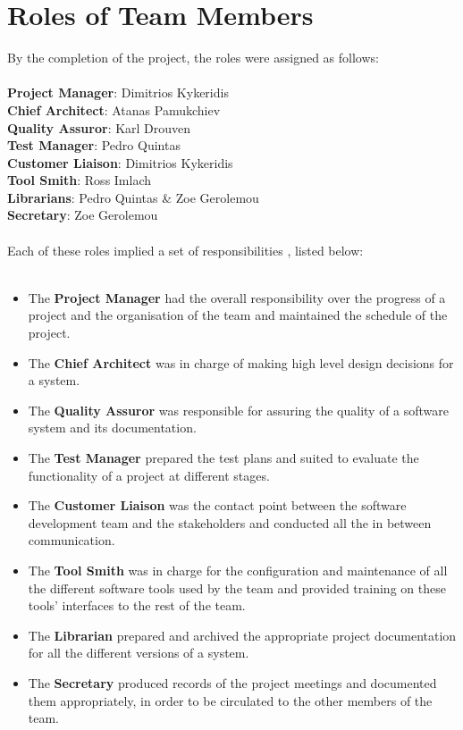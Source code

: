 \documentclass{l3proj}
\begin{document}
\section{Roles of Team Members}
\par
By the completion of the project, the roles were assigned as follows:\\
\\
\textbf{Project Manager}: Dimitrios Kykeridis\\
\textbf{Chief Architect}: Atanas Pamukchiev\\
\textbf{Quality Assuror}: Karl Drouven\\
\textbf{Test Manager}: Pedro Quintas\\
\textbf{Customer Liaison}: Dimitrios Kykeridis\\
\textbf{Tool Smith}: Ross Imlach\\
\textbf{Librarians}: Pedro Quintas \& Zoe Gerolemou\\
\textbf{Secretary}: Zoe Gerolemou\\
\\
Each of these roles implied a set of responsibilities \cite{PSD}, listed below:\\
\\
\begin{itemize}

\item The \textbf{Project Manager} had the overall responsibility over the progress of a project and the organisation of the team and maintained the schedule of the project.
\item The \textbf{Chief Architect} was in charge of making high level design decisions for a system.
\item The \textbf{Quality Assuror} was responsible for assuring the quality of a software system and its documentation.
\item The \textbf{Test Manager} prepared the test plans and suited to evaluate the functionality of a project at different stages.
\item The \textbf{Customer Liaison} was the contact point between the software development team and the stakeholders and conducted all the in between communication.
\item The \textbf{Tool Smith} was in charge for the configuration and maintenance of all the different software tools used by the team and provided training on these tools' interfaces to the rest of the team.
\item The \textbf{Librarian} prepared and archived the appropriate project documentation for all the different versions of a system.
\item The \textbf{Secretary} produced records of the project meetings and documented them appropriately, in order to be circulated to the other members of the team.

\end{itemize}
\end{document}
